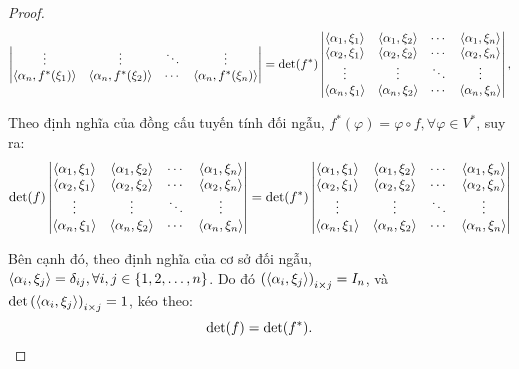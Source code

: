 \documentclass[class=nhvh-linear-algebra,crop=false]{standalone}
\begin{document}
\begin{proof}
\begin{align*}
\begin{vmatrix}
			\vdots                              & \vdots                              & \ddots & \vdots                              \\
			\left\langle{\alpha_{n},f^{*}(\xi_{1})}\right\rangle & \left\langle{\alpha_{n},f^{*}(\xi_{2})}\right\rangle & \cdots & \left\langle{\alpha_{n},f^{*}(\xi_{n})}\right\rangle \\
		\end{vmatrix}
		 & = \det(f^{*})
		\begin{vmatrix}
			\left\langle{\alpha_{1},\xi_{1}}\right\rangle & \left\langle{\alpha_{1},\xi_{2}}\right\rangle & \cdots & \left\langle{\alpha_{1},\xi_{n}}\right\rangle \\
			\left\langle{\alpha_{2},\xi_{1}}\right\rangle & \left\langle{\alpha_{2},\xi_{2}}\right\rangle & \cdots & \left\langle{\alpha_{2},\xi_{n}}\right\rangle \\
			\vdots                       & \vdots                       & \ddots & \vdots                       \\
			\left\langle{\alpha_{n},\xi_{1}}\right\rangle & \left\langle{\alpha_{n},\xi_{2}}\right\rangle & \cdots & \left\langle{\alpha_{n},\xi_{n}}\right\rangle \\
		\end{vmatrix}, \\
	\end{align*}
	\par Theo định nghĩa của đồng cấu tuyến tính đối ngẫu, $f^{*}(\varphi) = \varphi\circ f, \forall\varphi\in V^{*}$, suy ra:
	\[
		\det(f)
		\begin{vmatrix}
			\left\langle{\alpha_{1},\xi_{1}}\right\rangle & \left\langle{\alpha_{1},\xi_{2}}\right\rangle & \cdots & \left\langle{\alpha_{1},\xi_{n}}\right\rangle \\
			\left\langle{\alpha_{2},\xi_{1}}\right\rangle & \left\langle{\alpha_{2},\xi_{2}}\right\rangle & \cdots & \left\langle{\alpha_{2},\xi_{n}}\right\rangle \\
			\vdots                       & \vdots                       & \ddots & \vdots                       \\
			\left\langle{\alpha_{n},\xi_{1}}\right\rangle & \left\langle{\alpha_{n},\xi_{2}}\right\rangle & \cdots & \left\langle{\alpha_{n},\xi_{n}}\right\rangle \\
		\end{vmatrix}
		=
		\det(f^{*})
		\begin{vmatrix}
			\left\langle{\alpha_{1},\xi_{1}}\right\rangle & \left\langle{\alpha_{1},\xi_{2}}\right\rangle & \cdots & \left\langle{\alpha_{1},\xi_{n}}\right\rangle \\
			\left\langle{\alpha_{2},\xi_{1}}\right\rangle & \left\langle{\alpha_{2},\xi_{2}}\right\rangle & \cdots & \left\langle{\alpha_{2},\xi_{n}}\right\rangle \\
			\vdots                       & \vdots                       & \ddots & \vdots                       \\
			\left\langle{\alpha_{n},\xi_{1}}\right\rangle & \left\langle{\alpha_{n},\xi_{2}}\right\rangle & \cdots & \left\langle{\alpha_{n},\xi_{n}}\right\rangle \\
		\end{vmatrix}
	\]
	\par Bên cạnh đó, theo định nghĩa của cơ sở đối ngẫu, $\left\langle{\alpha_{i}, \xi_{j}}\right\rangle = \delta_{ij}, \forall i, j\in \{ 1, 2, \ldots, n \}$. Do đó ${(\left\langle{\alpha_{i}, \xi_{j}}\right\rangle)}_{i\times j} = I_{n}$, và $\det{(\left\langle{\alpha_{i}, \xi_{j}}\right\rangle)}_{i\times j} = 1$, kéo theo:
	\[
		\det(f) = \det(f^{*}).\qedhere
	\]
	\endgroup{}
\end{proof}
\end{document}
